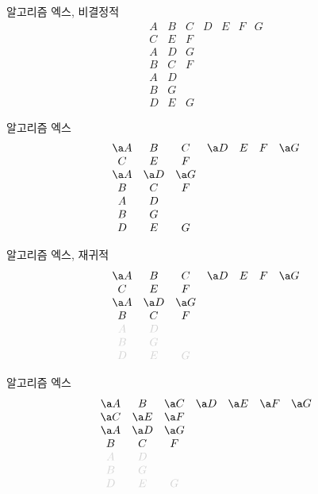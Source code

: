 \documentclass[xcolor=svgnames]{beamer}
\begin{document}
\renewcommand\arraystretch{1.2}

\begin{frame}{알고리즘 엑스, 비결정적}
\Large\boldmath
  $$
  \begin{array}{ccccccc}
    A & B & C & D & E & F & G\\
    C & E & F &&&&\\
    A & D & G &&&&\\
    B & C & F &&&&\\
    A & D &&&&&\\
    B & G &&&&&\\
    D & E & G &&&&
  \end{array}
  $$
\end{frame}

%
\begin{frame}{알고리즘 엑스}
\Large\boldmath
  $$
  \begin{array}{ccccccc}
    \a A & B & C & \a D & E & F & \a G\\
    C & E & F &&&&\\
    \a A & \a D & \a G &&&&\\
    B & C & F &&&&\\
    A & D &&&&&\\
    B & G &&&&&\\
    D & E & G &&&&
  \end{array}
  $$
\end{frame}

%
\begin{frame}{알고리즘 엑스, 재귀적}
\Large\boldmath
  $$
  \begin{array}{ccccccc}
    \a A & B & C & \a D & E & F & \a G\\
    C & E & F &&&&\\
    \a A & \a D & \a G &&&&\\
    B & C & F &&&&\\
    \g A & \g D &&&&&\\
    \g B & \g G &&&&&\\
    \g D & \g E & \g G &&&&
  \end{array}
  $$
\end{frame}

%
\begin{frame}{알고리즘 엑스}
\Large\boldmath
  $$
  \begin{array}{ccccccc}
    \a A & B & \a C & \a D & \a E & \a F & \a G\\
    \a C & \a E & \a F &&&&\\
    \a A & \a D & \a G &&&&\\
    B & C & F &&&&\\
    \g A & \g D &&&&&\\
    \g B & \g G &&&&&\\
    \g D & \g E & \g G &&&&
  \end{array}
  $$
\end{frame}
\end{document}
